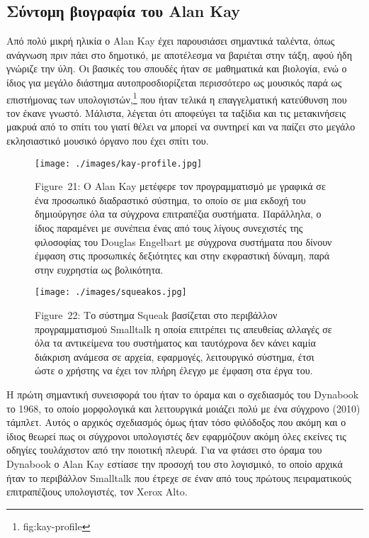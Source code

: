 \documentclass[
]{article}
\begin{document}
\hypertarget{ux3c3ux3cdux3bdux3c4ux3bfux3bcux3b7-ux3b2ux3b9ux3bfux3b3ux3c1ux3b1ux3c6ux3afux3b1-ux3c4ux3bfux3c5-alan-kay}{%
\subsection{Σύντομη βιογραφία του Alan
Kay}\label{ux3c3ux3cdux3bdux3c4ux3bfux3bcux3b7-ux3b2ux3b9ux3bfux3b3ux3c1ux3b1ux3c6ux3afux3b1-ux3c4ux3bfux3c5-alan-kay}}

Από πολύ μικρή ηλικία ο Alan Kay έχει παρουσιάσει σημαντικά ταλέντα,
όπως ανάγνωση πριν πάει στο δημοτικό, με αποτέλεσμα να βαριέται στην
τάξη, αφού ήδη γνώριζε την ύλη. Οι βασικές του σπουδές ήταν σε
μαθηματικά και βιολογία, ενώ ο ίδιος για μεγάλο διάστημα
αυτοπροσδιορίζεται περισσότερο ως μουσικός παρά ως επιστήμονας των
υπολογιστών,\footnote{fig:kay-profile} που ήταν τελικά η επαγγελματική
κατεύθυνση που τον έκανε γνωστό. Μάλιστα, λέγεται ότι αποφεύγει τα
ταξίδια και τις μετακινήσεις μακρυά από το σπίτι του γιατί θέλει να
μπορεί να συντηρεί και να παίζει στο μεγάλο εκλησιαστικό μουσικό όργανο
που έχει σπίτι του.

\leavevmode{}%
\begin{figure}
\hypertarget{fig:kay-profile}{%
\centering
\texttt{[image: ./images/kay-profile.jpg]}
\caption{Figure~21: Ο Alan Kay μετέφερε τον προγραμματισμό με γραφικά σε
ένα προσωπικό διαδραστικό σύστημα, το οποίο σε μια εκδοχή του
δημιούργησε όλα τα σύγχρονα επιτραπέζια συστήματα. Παράλληλα, ο ίδιος
παραμένει με συνέπεια ένας από τους λίγους συνεχιστές της φιλοσοφίας του
Douglas Engelbart με σύγχρονα συστήματα που δίνουν έμφαση στις
προσωπικές δεξιότητες και στην εκφραστική δύναμη, παρά στην ευχρηστία ως
βολικότητα.}\label{fig:kay-profile}
}
\end{figure}

\leavevmode{}%
\begin{figure}
\hypertarget{fig:squeakos}{%
\centering
\texttt{[image: ./images/squeakos.jpg]}
\caption{Figure~22: Το σύστημα Squeak βασίζεται στο περιβάλλον
προγραμματισμού Smalltalk η οποία επιτρέπει τις απευθείας αλλαγές σε όλα
τα αντικείμενα του συστήματος και ταυτόχρονα δεν κάνει καμία διάκριση
ανάμεσα σε αρχεία, εφαρμογές, λειτουργικό σύστημα, έτσι ώστε ο χρήστης
να έχει τον πλήρη έλεγχο με έμφαση στα έργα του.}\label{fig:squeakos}
}
\end{figure}

Η πρώτη σημαντική συνεισφορά του ήταν το όραμα και ο σχεδιασμός του
Dynabook το 1968, το οποίο μορφολογικά και λειτουργικά μοιάζει πολύ με
ένα σύγχρονο (2010) τάμπλετ. Αυτός ο αρχικός σχεδιασμός όμως ήταν τόσο
φιλόδοξος που ακόμη και ο ίδιος θεωρεί πως οι σύγχρονοι υπολογιστές δεν
εφαρμόζουν ακόμη όλες εκείνες τις οδηγίες τουλάχιστον από την ποιοτική
πλευρά. Για να φτάσει στο όραμα του Dynabook ο Alan Kay εστίασε την
προσοχή του στο λογισμικό, το οποίο αρχικά ήταν το περιβάλλον Smalltalk
που έτρεχε σε έναν από τους πρώτους πειραματικούς επιτραπέζιους
υπολογιστές, τον Xerox Alto.
\end{document}

